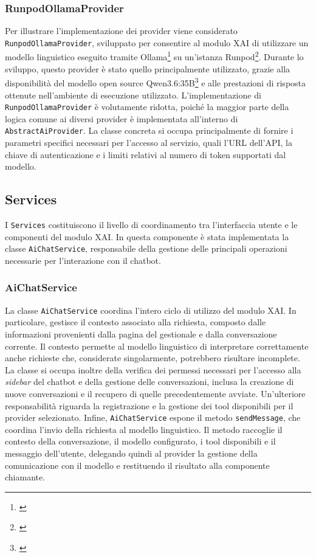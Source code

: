 \subsubsection*{RunpodOllamaProvider}
Per illustrare l'implementazione dei provider viene considerato \newline\texttt{RunpodOllamaProvider}, sviluppato per consentire al modulo XAI di utilizzare un modello linguistico 
eseguito tramite Ollama\footnote{\cite{site:ollama}} su un'istanza Runpod\footnote{\cite{site:runpod}}. Durante lo sviluppo, questo provider è stato quello principalmente utilizzato, grazie alla disponibilità del modello open source 
Qwen3.6:35B\footnote{\cite{site:qwen}} e alle prestazioni di risposta ottenute nell'ambiente di esecuzione utilizzato.
\newline
L'implementazione di \texttt{RunpodOllamaProvider} è volutamente ridotta, poiché la maggior parte della logica comune ai diversi provider è implementata all'interno di 
\texttt{AbstractAiProvider}. La classe concreta si occupa principalmente di fornire i parametri specifici necessari per l'accesso al servizio, quali l'URL dell'API, la chiave 
di autenticazione e i limiti relativi al numero di token supportati dal modello.

\subsection{Services}
I \texttt{Services} costituiscono il livello di coordinamento tra l'interfaccia utente e le componenti del modulo XAI. In questa componente è stata implementata la classe 
\texttt{AiChatService}, responsabile della gestione delle principali operazioni necessarie per l'interazione con il chatbot.

\subsubsection*{AiChatService}
La classe \texttt{AiChatService} coordina l'intero ciclo di utilizzo del modulo XAI. In particolare, gestisce il contesto associato alla richiesta, composto dalle informazioni 
provenienti dalla pagina del gestionale e dalla conversazione corrente. Il contesto permette al modello linguistico di interpretare correttamente anche richieste che, considerate 
singolarmente, potrebbero risultare incomplete.
\newline
La classe si occupa inoltre della verifica dei permessi necessari per l'accesso alla \textit{sidebar} del chatbot e della gestione delle conversazioni, inclusa la creazione di 
nuove conversazioni e il recupero di quelle precedentemente avviate. Un'ulteriore responsabilità riguarda la registrazione e la gestione dei tool disponibili per il provider 
selezionato.
\newline
Infine, \texttt{AiChatService} espone il metodo \texttt{sendMessage}, che coordina l'invio della richiesta al modello linguistico. Il metodo raccoglie il contesto della 
conversazione, il modello configurato, i tool disponibili e il messaggio dell'utente, delegando quindi al provider la gestione della comunicazione con il modello e restituendo 
il risultato alla componente chiamante.


